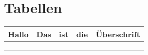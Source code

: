 \section{Tabellen}
\begin{table}[h]
\begin{tabular}{l|l|l|l|l}
Hallo & Das & ist & die & Überschrift \\ \hline
      &     &     &     &             \\
      &     &     &     &             \\
      &     &     &     &            
\end{tabular}
\end{table}